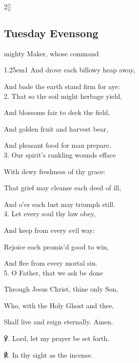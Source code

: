 \begin{paracol}{2}[]
\switchcolumn

\subsection{Tuesday Evensong}\label{TuesdayEvensong}

 mighty Maker, whose command


\begin{hangparas}{1.25em}{1}
And drove each billowy heap away,

And bade the earth stand firm for aye:\\

2. That so the soil might herbage yield,

And blossoms fair to deck the field,

And golden fruit and harvest bear,

And pleasant food for man prepare.\\

3. Our spirit's rankling wounds efface

With dewy freshness of thy grace:

That grief may cleanse each deed of ill,

And o'er each lust may triumph still.\\

4. Let every soul thy law obey,

And keep from every evil way:

Rejoice each promis'd good to win,

And flee from every mortal sin.\\

5. O Father, that we ask be done

Through Jesus Christ, thine only Son,

Who, with the Holy Ghost and thee,

Shall live and reign eternally. Amen.\\
\end{hangparas}

℣. Lord, let my prayer be set forth.

℟. In thy sight as the incense.


\fussy
\end{paracol}



